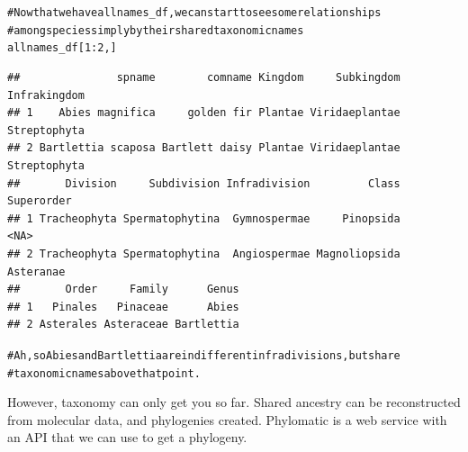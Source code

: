 \documentclass[10pt]{article}\usepackage[]{graphicx}\usepackage[]{color}
\makeatletter
\newcommand{\hlcomment}[1]{\textcolor[rgb]{0.180392156862745,0.6,0.341176470588235}{#1}}%
\newenvironment{kframe}{%
 \def\at@end@of@kframe{}%
 \ifinner\ifhmode%
  \def\at@end@of@kframe{\end{minipage}}%
  \begin{minipage}{\columnwidth}%
 \fi\fi%
 \def\FrameCommand##1{\hskip\@totalleftmargin \hskip-\fboxsep
 \colorbox{shadecolor}{##1}\hskip-\fboxsep
     \hskip-\linewidth \hskip-\@totalleftmargin \hskip\columnwidth}%
 \MakeFramed {\advance\hsize-\width
   \@totalleftmargin\z@ \linewidth\hsize
   \@setminipage}}%
 {\par\unskip\endMakeFramed%
 \at@end@of@kframe}
\newenvironment{knitrout}{}{} %
\makeatother
\begin{document}
\begin{knitrout}
\begin{kframe}
\begin{alltt}
\hlcomment{# Now that we have allnames_df, we can start to see some relationships}
\hlcomment{# among species simply by their shared taxonomic names}
allnames_df[1:2, ]
\end{alltt}
\begin{verbatim}
##               spname        comname Kingdom     Subkingdom Infrakingdom
## 1    Abies magnifica     golden fir Plantae Viridaeplantae Streptophyta
## 2 Bartlettia scaposa Bartlett daisy Plantae Viridaeplantae Streptophyta
##       Division     Subdivision Infradivision         Class Superorder
## 1 Tracheophyta Spermatophytina  Gymnospermae     Pinopsida       <NA>
## 2 Tracheophyta Spermatophytina  Angiospermae Magnoliopsida  Asteranae
##       Order     Family      Genus
## 1   Pinales   Pinaceae      Abies
## 2 Asterales Asteraceae Bartlettia
\end{verbatim}
\begin{alltt}

\hlcomment{# Ah, so Abies and Bartlettia are in different infradivisions, but share}
\hlcomment{# taxonomic names above that point.}
\end{alltt}
\end{kframe}
\end{knitrout}


However, taxonomy can only get you so far. Shared ancestry can be reconstructed from molecular data, and phylogenies created. Phylomatic is a web service with an API that we can use to get a phylogeny. 
\end{document}

